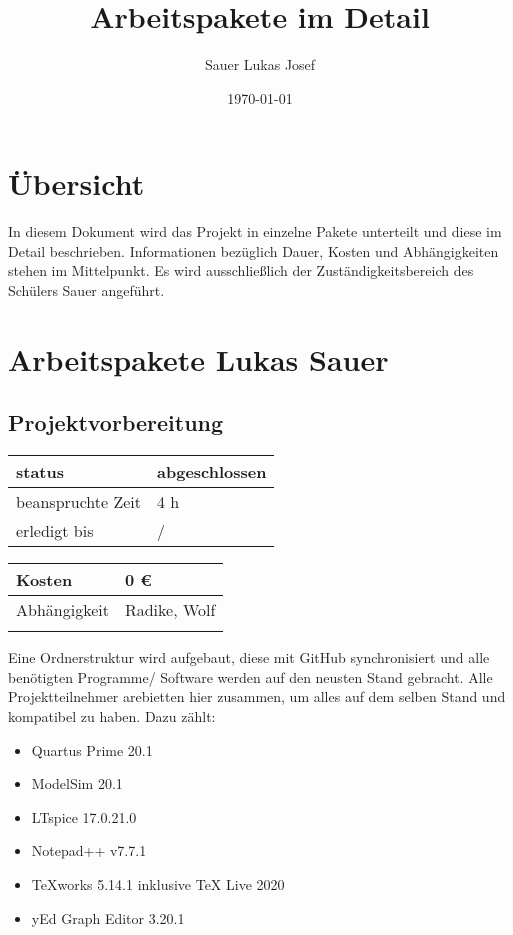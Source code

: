 \documentclass{scrartcl}
\begin{document}
\title{Arbeitspakete im Detail}
\author{Sauer Lukas Josef}
\date{\today}
\maketitle

\tableofcontents 
\newpage

\section{Übersicht}
In diesem Dokument wird das Projekt in einzelne Pakete unterteilt und diese im Detail beschrieben. Informationen bezüglich Dauer, Kosten und Abhängigkeiten stehen im Mittelpunkt. Es wird ausschließlich der Zuständigkeitsbereich des Schülers Sauer angeführt.
\section{Arbeitspakete Lukas Sauer}
\subsection{Projektvorbereitung}
\begin{tabular}[h]{|l|l|} %
	\hline
	status & abgeschlossen\\
	\hline
	beanspruchte Zeit & 4 h\\
	\hline
	erledigt bis & / \\
	\hline
\end{tabular}
\begin{tabular}[h]{|l|l|} %
	\hline
	Kosten & 0 €\\
	\hline
	Abhängigkeit & Radike, Wolf\\
	\hline
	 &  \\
	\hline
\end{tabular}
Eine Ordnerstruktur wird aufgebaut, diese mit GitHub synchronisiert und alle benötigten Programme/ Software werden auf den neusten Stand gebracht. Alle Projektteilnehmer arebietten hier zusammen, um alles auf dem selben Stand und kompatibel zu haben.
Dazu zählt:
\begin{itemize}
\item Quartus Prime 20.1
\item ModelSim 20.1
\item LTspice 17.0.21.0
\item Notepad++ v7.7.1
\item TeXworks 5.14.1 inklusive TeX Live 2020
\item yEd Graph Editor 3.20.1
\end {itemize}
\end{document}
